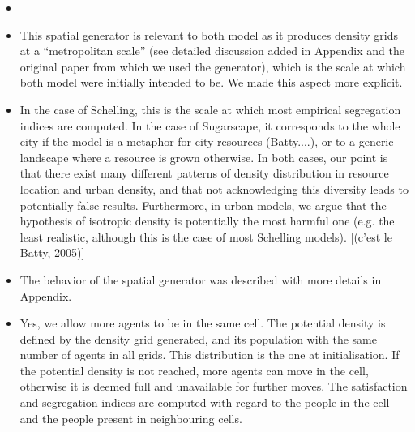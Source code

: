 \documentclass[11pt,a4paper,sans]{moderncv}        %
\begin{document}
\begin{itemize}
	\item {}
	
	\item This spatial generator is relevant to both model as it produces density grids at a ``metropolitan scale'' (see detailed discussion added in Appendix and the original paper from which we used the generator), which is the scale at which both model were initially intended to be. We made this aspect more explicit. 
	
	\item In the case of Schelling, this is the scale at which most empirical segregation indices are computed. In the case of Sugarscape, it corresponds to the whole city if the model is a metaphor for city resources (Batty....), or to a generic landscape where a resource is grown otherwise. In both cases, our point is that there exist many different patterns of density distribution in resource location and urban density, and that not acknowledging this diversity leads to potentially false results. Furthermore, in urban models, we argue that the hypothesis of isotropic density is potentially the most harmful one (e.g. the least realistic, although this is the case of most Schelling models).
	[(c'est le Batty, 2005)]
	
	
	\item The behavior of the spatial generator was described with more details in Appendix.
	
	\item Yes, we allow more agents to be in the same cell. The potential density is defined by the density grid generated, and its population with the same number of agents in all grids. This distribution is the one at initialisation. If the potential density is not reached, more agents can move in the cell, otherwise it is deemed full and unavailable for further moves. The satisfaction and segregation indices are computed with regard to the people in the cell and the people present in neighbouring cells.
	

\end{itemize}
\end{document}
